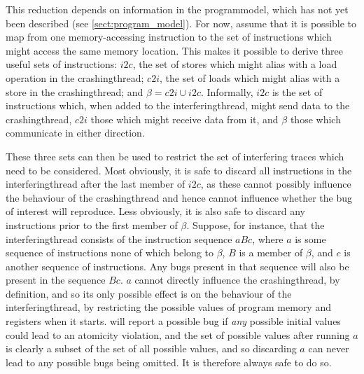 This reduction depends on information in the \gls{programmodel}, which
has not yet been described (see \autoref{sect:program_model}).  For
now, assume that it is possible to map from one memory-accessing
instruction to the set of instructions which might access the same
memory location.  This makes it possible to derive three useful sets
of instructions: $i2c$, the set of stores which might alias with a
load operation in the \gls{crashingthread}; $c2i$, the set of loads
which might alias with a store in the \gls{crashingthread}; and $\beta
= c2i \cup i2c$.  Informally, $i2c$ is the set of instructions which,
when added to the \gls{interferingthread}, might send data to the
\gls{crashingthread}, $c2i$ those which might receive data from it,
and $\beta$ those which communicate in either direction.

These three sets can then be used to restrict the set of interfering
traces which need to be considered.  Most obviously, it is safe to
discard all instructions in the \gls{interferingthread} after the last
member of $i2c$, as these cannot possibly influence the behaviour of
the \gls{crashingthread} and hence cannot influence whether the bug of
interest will reproduce.  Less obviously, it is also safe to discard
any instructions prior to the first member of $\beta$.  Suppose, for
instance, that the \gls{interferingthread} consists of the instruction
sequence $aBc$, where $a$ is some sequence of instructions none of
which belong to $\beta$, $B$ is a member of $\beta$, and $c$ is
another sequence of instructions.  Any bugs present in that sequence
will also be present in the sequence $Bc$.  $a$ cannot directly
influence the \gls{crashingthread}, by definition, and so its only
possible effect is on the behaviour of the \gls{interferingthread}, by
restricting the possible values of program memory and registers when
it starts.  {\Technique} will report a possible bug if \emph{any}
possible initial values could lead to an atomicity violation, and the
set of possible values after running $a$ is clearly a subset of the
set of all possible values, and so discarding $a$ can never lead to
any possible bugs being omitted.  It is therefore always safe to do
so.

